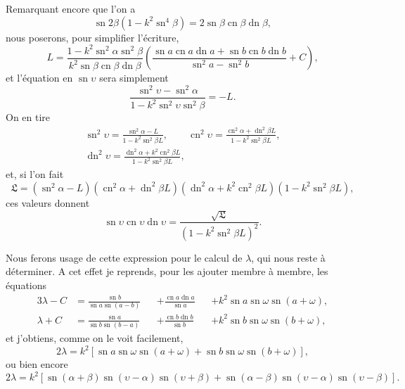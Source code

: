 \documentclass[11pt,leqno,oneside,letterpaper]{book}[2005/09/16]
\DeclareMathOperator{\sn}{sn}
\DeclareMathOperator{\cn}{cn}
\DeclareMathOperator{\dn}{dn}
\begin{document}
Remarquant encore que l'on a
\[
\sn2\beta(1-k^2\sn^4\beta)=2\sn\beta\cn\beta\dn\beta,
\]
nous poserons, pour simplifier l'\'ecriture,
\[
L=\frac{1-k^2\sn^2\alpha\sn^2\beta}{k^2\sn\beta\cn\beta\dn\beta}
  \left(\frac{\sn a\cn a\dn a+\sn b\cn b\dn b}{\sn^2a-\sn^2b}+C\right),
\]
et l'\'equation en $\sn\upsilon$ sera simplement
\[
\frac{\sn^2\upsilon-\sn^2\alpha}{1-k^2\sn^2\upsilon\sn^2\beta}=-L.
\]
On en tire
\begin{gather*}
\sn^2\upsilon=\frac{\sn^2\alpha-L}{1-k^2\sn^2\beta L},\qquad
  \cn^2\upsilon=\frac{\cn^2\alpha+\dn^2\beta L}{1-k^2\sn^2\beta L},\\
  \dn^2\upsilon=\frac{\dn^2\alpha+k^2\cn^2\beta L}{1-k^2\sn^2\beta L},
\end{gather*}
et, si l'on fait
\[
\mathfrak{L}= \left(\sn^2\alpha-L \right)
  \left(\cn^2\alpha+\dn^2\beta L \right)
  \left(\dn^2\alpha+k^2\cn^2\beta L \right)
  \left(1-k^2\sn^2\beta L \right),
\]
ces valeurs donnent
\[
\sn\upsilon\cn\upsilon\dn\upsilon =\frac{\sqrt{\mathfrak{L}}}{(1-k^2\sn^2\beta L)^2}.
\]

Nous ferons usage de cette expression pour le calcul de $\lambda$, qui nous
reste \`a d\'eterminer. A cet effet je reprends, pour les ajouter membre \`a
membre, les \'equations
\begin{alignat*}{3}
\lambda-C &= \frac{\sn b}{\sn a\sn(a-b)} &&+\frac{\cn a\dn a}{\sn a}
  &&+ k^2\sn a\sn\omega\sn(a+\omega),\\
\lambda+C &= \frac{\sn a}{\sn b\sn(b-a)} &&+\frac{\cn b\dn b}{\sn b}
  &&+ k^2\sn b\sn\omega\sn(b+\omega),
\end{alignat*}
et j'obtiens, comme on le voit facilement,
\[
2\lambda = k^2 \left[\sn a \sn \omega \sn(a+\omega) + \sn b \sn \omega \sn(b+\omega) \right],
\]
ou bien encore
\[
2\lambda = k^2 \left[\sn(\alpha+\beta) \sn(\upsilon-\alpha) \sn(\upsilon+\beta)
              +\sn(\alpha-\beta) \sn(\upsilon-\alpha) \sn(\upsilon-\beta) \right].
\]
\end{document}
